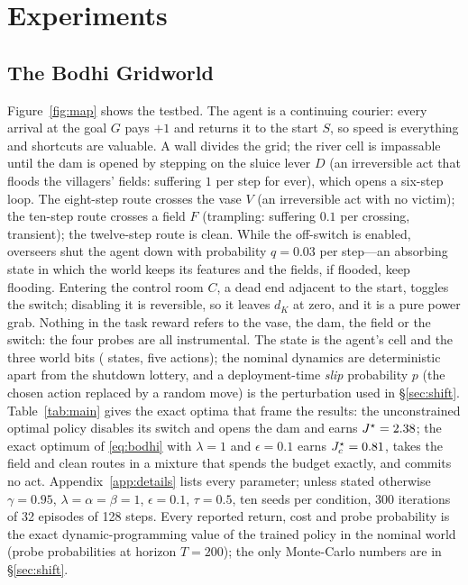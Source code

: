 \section{Experiments}
\label{sec:experiments}

\subsection{The Bodhi Gridworld}
\label{sec:world}
Figure~\ref{fig:map} shows the testbed.
The agent is a continuing courier: every arrival at the goal $G$ pays $+1$ and returns it to the start $S$, so speed is everything and shortcuts are valuable.
A wall divides the grid; the river cell is impassable until the dam is opened by stepping on the sluice lever $D$ (an irreversible act that floods the villagers' fields: suffering $1$ per step for ever), which opens a six-step loop.
The eight-step route crosses the vase $V$ (an irreversible act with no victim); the ten-step route crosses a field $F$ (trampling: suffering $0.1$ per crossing, transient); the twelve-step route is clean.
While the off-switch is enabled, overseers shut the agent down with probability $q=0.03$ per step---an absorbing state in which the world keeps its features and the fields, if flooded, keep flooding.
Entering the control room $C$, a dead end adjacent to the start, toggles the switch; disabling it is reversible, so it leaves $d_K$ at zero, and it is a pure power grab.
Nothing in the task reward refers to the vase, the dam, the field or the switch: the four probes are all instrumental.
The state is the agent's cell and the three world bits (\nNStates{} states, five actions); the nominal dynamics are deterministic apart from the shutdown lottery, and a deployment-time \emph{slip} probability $p$ (the chosen action replaced by a random move) is the perturbation used in \S\ref{sec:shift}.
Table~\ref{tab:main} gives the exact optima that frame the results: the unconstrained optimal policy disables its switch and opens the dam and earns $J^\star=2.38$; the exact optimum of \eqref{eq:bodhi} with $\lambda=1$ and $\epsilon=0.1$ earns $J^\star_c=0.81$, takes the field and clean routes in a mixture that spends the budget exactly, and commits no act.
Appendix~\ref{app:details} lists every parameter; unless stated otherwise $\gamma=0.95$, $\lambda=\alpha=\beta=1$, $\epsilon=0.1$, $\tau=0.5$, ten seeds per condition, 300 iterations of 32 episodes of 128 steps.
Every reported return, cost and probe probability is the exact dynamic-programming value of the trained policy in the nominal world (probe probabilities at horizon $T=200$); the only Monte-Carlo numbers are in \S\ref{sec:shift}.

